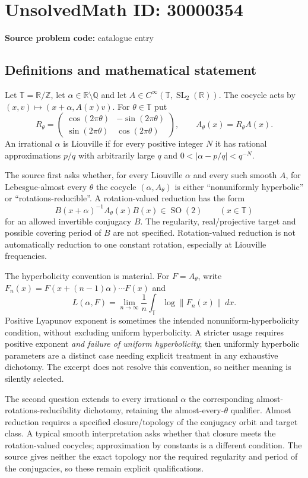 \documentclass[11pt]{article}
\newcommand{\Z}{\mathbb{Z}}
\newcommand{\Q}{\mathbb{Q}}
\newcommand{\R}{\mathbb{R}}
\begin{document}
\section*{UnsolvedMath ID: 30000354}
\textbf{Source problem code:} catalogue entry
\subsection{Definitions and mathematical statement}
Let $\mathbb T=\R/\Z$, let $\alpha\in\R\setminus\Q$ and let $A\in C^\infty(\mathbb T,\operatorname{SL}_2(\R))$. The cocycle acts by $(x,v)\mapsto(x+\alpha,A(x)v)$. For $\theta\in\mathbb T$ put
\[
 R_\theta=\begin{pmatrix}\cos(2\pi\theta)&-\sin(2\pi\theta)\\
 \sin(2\pi\theta)&\cos(2\pi\theta)\end{pmatrix},
 \qquad A_\theta(x)=R_\theta A(x).
\]
An irrational $\alpha$ is Liouville if for every positive integer $N$ it has rational approximations $p/q$ with arbitrarily large $q$ and $0<|\alpha-p/q|<q^{-N}$.

The source first asks whether, for every Liouville $\alpha$ and every such smooth $A$, for Lebesgue-almost every $\theta$ the cocycle $(\alpha,A_\theta)$ is either ``nonuniformly hyperbolic'' or ``rotations-reducible''. A rotation-valued reduction has the form
\[
 B(x+\alpha)^{-1}A_\theta(x)B(x)\in\operatorname{SO}(2)
 \qquad(x\in\mathbb T)
\]
for an allowed invertible conjugacy $B$. The regularity, real/projective target and possible covering period of $B$ are not specified. Rotation-valued reduction is not automatically reduction to one constant rotation, especially at Liouville frequencies.

The hyperbolicity convention is material. For $F=A_\theta$, write $F_n(x)=F(x+(n-1)\alpha)\cdots F(x)$ and
\[
 L(\alpha,F)=\lim_{n\to\infty}\frac1n\int_{\mathbb T}\log\|F_n(x)\|\,dx.
\]
Positive Lyapunov exponent is sometimes the intended nonuniform-hyperbolicity condition, without excluding uniform hyperbolicity. A stricter usage requires positive exponent \emph{and failure of uniform hyperbolicity}; then uniformly hyperbolic parameters are a distinct case needing explicit treatment in any exhaustive dichotomy. The excerpt does not resolve this convention, so neither meaning is silently selected.

The second question extends to every irrational $\alpha$ the corresponding almost-rotations-reducibility dichotomy, retaining the almost-every-$\theta$ qualifier. Almost reduction requires a specified closure/topology of the conjugacy orbit and target class. A typical smooth interpretation asks whether that closure meets the rotation-valued cocycles; approximation by constants is a different condition. The source gives neither the exact topology nor the required regularity and period of the conjugacies, so these remain explicit qualifications.
\end{document}

